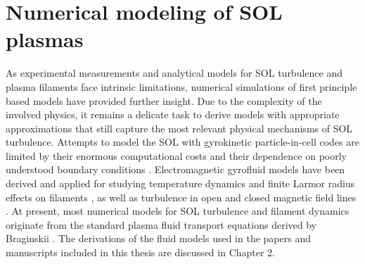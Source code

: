 \section{Numerical modeling of SOL plasmas}
As experimental measurements and analytical models for SOL turbulence and plasma filaments face intrinsic limitations, numerical simulations of first principle based models have provided further insight. Due to the complexity of the involved physics, it remains a delicate task to derive models with appropriate approximations that still capture the most relevant physical mechanisms of SOL turbulence. Attempts to model the SOL with gyrokinetic particle-in-cell codes are limited by their enormous computational costs and their dependence on poorly understood boundary conditions \cite{chang2008spontaneous,churchill2017pedestal}. Electromagnetic gyrofluid models have been derived \cite{madsen2013full} and applied for studying temperature dynamics and finite Larmor radius effects on filaments \cite{wiesenberger2014radial,held2016influence}, as well as turbulence in open and closed magnetic field lines \cite{ribeiro2005tokamak,ribeiro2008gyrofluid}. At present, most numerical models for SOL turbulence and filament dynamics originate from the standard plasma fluid transport equations derived by Braginskii \cite{braginskii}. The derivations of the fluid models used in the papers and manuscripts included in this thesis are discussed in Chapter 2. 

